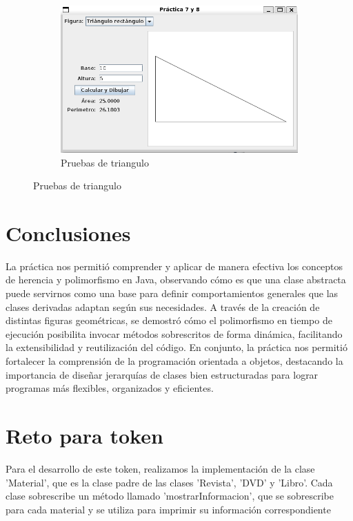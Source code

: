 \documentclass[letterpaper,12pt]{article}
\begin{document}
\begin{figure}[H]
\begin{subfigure}{0.6\textwidth}
        \includegraphics[width=\linewidth]{Imagenes/triangulo.png}
        \caption*{Pruebas de triangulo}
    \end{subfigure}
\end{figure}

\clearpage

\section{Conclusiones}

La práctica nos permitió comprender y aplicar de manera efectiva los conceptos de herencia y polimorfismo en Java, observando cómo es que una clase abstracta puede servirnos como una base para definir comportamientos generales que las clases derivadas adaptan según sus necesidades. A través de la creación de distintas figuras geométricas, se demostró cómo el polimorfismo en tiempo de ejecución posibilita invocar métodos sobrescritos de forma dinámica, facilitando la extensibilidad y reutilización del código. En conjunto, la práctica nos permitió fortalecer la comprensión de la programación orientada a objetos, destacando la importancia de diseñar jerarquías de clases bien estructuradas para lograr programas más flexibles, organizados y eficientes.

\printbibliography

\clearpage

\section{Reto para token}

Para el desarrollo de este token, realizamos la implementación de la clase 'Material', que es la clase padre de las clases 'Revista', 'DVD' y 'Libro'. Cada clase sobrescribe un método llamado 'mostrarInformacion', que se sobrescribe para cada material y se utiliza para imprimir su información correspondiente
\end{document}
